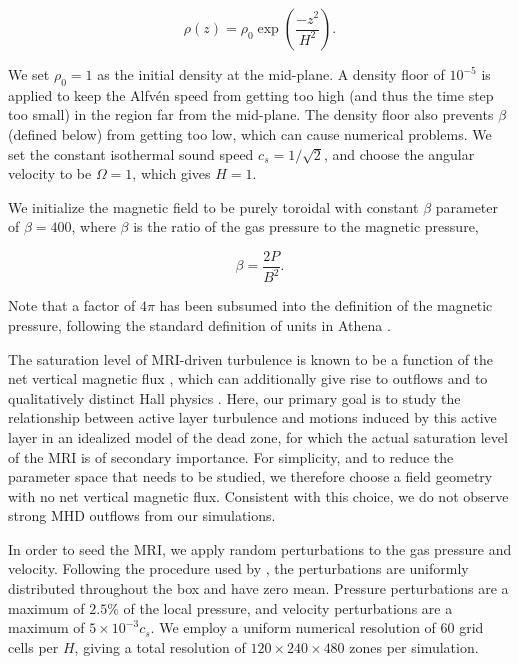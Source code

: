 \begin{equation}
\rho(z) = \rho_0 \exp\left(\frac{-z^2}{H^2}\right).                  
\end{equation}

\noindent We set $\rho_0 = 1$ as the initial density at the mid-plane.  A density floor of $10^{-5}$ is applied to keep the Alfv\'en speed from getting too high (and thus the time step too small) in the region far from the mid-plane.  The density floor also prevents $\beta$ (defined below) from getting too low, which can cause numerical problems. We set 
the constant isothermal sound speed $c_s=1/\sqrt{2}$, and choose the angular velocity to be $\Omega = 1$, which gives $H = 1$.


We initialize the magnetic field to be purely toroidal with constant $\beta$ parameter of $\beta=400$, where $\beta$ is the ratio of the gas pressure to the magnetic pressure, 

\begin{equation}
\beta = \frac{2P}{B^2}.                   
\end{equation}

\noindent 
Note that a factor of $4\pi$ has been subsumed into the definition of the magnetic pressure, following the standard definition of units in {\sc Athena} \citep{stone08}.
 
The saturation level of MRI-driven turbulence is known to be a function of the net vertical magnetic flux 
\citep{hawley95,salvesen16}, which can additionally give rise to outflows \citep{bai13b} and to qualitatively 
distinct Hall physics \citep{lesur14,bai14,simon15}. Here, our 
primary goal is to study the relationship between active layer turbulence
and motions induced by this active layer in an idealized model of the dead zone, for which the actual 
saturation level of the MRI is of secondary importance. For simplicity, and to reduce the parameter space 
that needs to be studied, we therefore choose a field geometry with no net vertical magnetic flux. Consistent 
with this choice, we do not observe strong MHD outflows from our simulations.
 
In order to seed the MRI, we apply random perturbations to the gas pressure and velocity. Following the procedure used by \cite{hawley95}, the perturbations are uniformly distributed throughout the box and have zero mean.  Pressure perturbations are a maximum of $2.5 \%$ of the local pressure, and velocity perturbations are a maximum of $5\times 10^{-3}c_s$. We employ a uniform numerical resolution of 60 grid cells per $H$, giving a total resolution of $120\times240\times480$ zones per simulation.  


